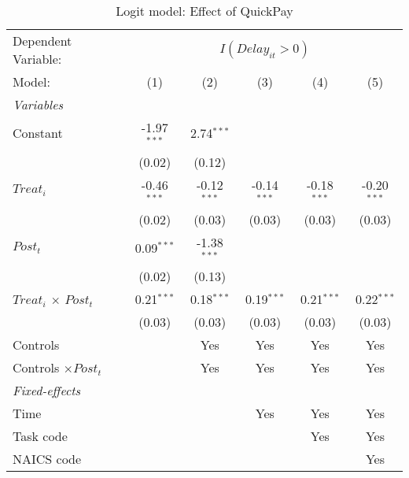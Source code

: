 \documentclass[
]{article}
\begin{document}
\begin{table}[htbp]
   \caption{Logit model: Effect of QuickPay}
   \centering
   \begin{tabular}{lccccc}
      \tabularnewline \midrule \midrule
      Dependent Variable: & \multicolumn{5}{c}{$I(Delay_{it}>0)$}\\
      Model:                       & (1)           & (2)           & (3)           & (4)           & (5)\\  
      \midrule
      \emph{Variables}\\
      Constant                     & -1.97$^{***}$ & 2.74$^{***}$  &               &               &   \\   
                                   & (0.02)        & (0.12)        &               &               &   \\   
      $Treat_i$                    & -0.46$^{***}$ & -0.12$^{***}$ & -0.14$^{***}$ & -0.18$^{***}$ & -0.20$^{***}$\\   
                                   & (0.02)        & (0.03)        & (0.03)        & (0.03)        & (0.03)\\   
      $Post_t$                     & 0.09$^{***}$  & -1.38$^{***}$ &               &               &   \\   
                                   & (0.02)        & (0.13)        &               &               &   \\   
      $Treat_i$ $\times$ $Post_t$  & 0.21$^{***}$  & 0.18$^{***}$  & 0.19$^{***}$  & 0.21$^{***}$  & 0.22$^{***}$\\   
                                   & (0.03)        & (0.03)        & (0.03)        & (0.03)        & (0.03)\\   
      Controls                     &               & Yes           & Yes           & Yes           & Yes\\  
      Controls $\times Post_t$     &               & Yes           & Yes           & Yes           & Yes\\  
      \midrule
      \emph{Fixed-effects}\\
      Time                         &               &               & Yes           & Yes           & Yes\\  
      Task code                    &               &               &               & Yes           & Yes\\  
      NAICS code                   &               &               &               &               & Yes\\  

\end{tabular}
\end{table}
\end{document}
